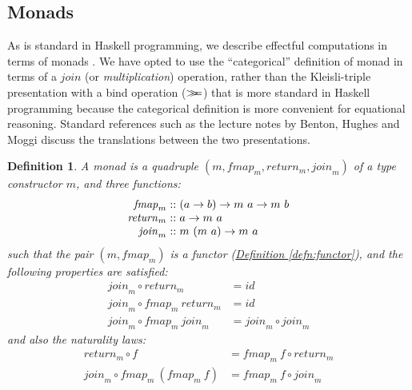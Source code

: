 \documentclass{jfp1}
\newcommand{\mbind}{\mathrel{>\kern-0.45em>\kern-0.45em=}}
\newtheorem{definition}{Definition}
\newcommand{\defref}[1]{\hyperref[#1]{Definition \ref*{#1}}}
\begin{document}
\subsection{Monads}

As is standard in Haskell programming, we describe effectful
computations in terms of monads \cite{moggi91notions,
  peytonjones93imperative}. We have opted to use the ``categorical''
definition of monad in terms of a $\mathit{join}$ (or
\emph{multiplication}) operation, rather than the Kleisli-triple
presentation with a bind operation ($\mbind$) that is more standard in
Haskell programming because the categorical definition is more
convenient for equational reasoning. Standard references such as the
lecture notes by Benton, Hughes and Moggi \cite{benton00monads}
discuss the translations between the two presentations.

\begin{definition}\label{defn:monad}
  A monad is a quadruple $(m, \mathit{fmap}_m, \mathit{return}_m,
  \mathit{join}_m)$ of a type constructor $m$, and three functions:
  \begin{displaymath}
    \begin{array}{r@{\hspace{0.3em}}c@{\hspace{0.3em}}l}
      \mathit{fmap}_m   & :: & (a \to b) \to m~a \to m~b \\
      \mathit{return}_m & :: & a \to m~a \\
      \mathit{join}_m   & :: & m~(m~a) \to m~a
    \end{array}
  \end{displaymath}
  such that the pair $(m, \mathit{fmap}_m)$ is a functor
  (\defref{defn:functor}), and the following properties are satisfied:
  \begin{align}
    \label{eq:monad-join-return}
    \mathit{join}_m \circ \mathit{return}_m & = \mathit{id} \\
    \label{eq:monad-join-fmap-return}
    \mathit{join}_m \circ \mathit{fmap}_m~\mathit{return}_m & = \mathit{id} \\
    \label{eq:monad-join-join}
    \mathit{join}_m \circ \mathit{fmap}_m~\mathit{join}_m & = \mathit{join}_m \circ \mathit{join}_m
  \end{align}
  and also the naturality laws:
  \begin{align}
    \label{eq:monad-return-natural}
    \mathit{return}_m \circ f & = \mathit{fmap}_m~f \circ \mathit{return}_m \\
    \label{eq:monad-join-natural}
    \mathit{join}_m \circ \mathit{fmap}_m~(\mathit{fmap}_m~f) & = \mathit{fmap}_m~f \circ \mathit{join}_m
  \end{align}
\end{definition}
\end{document}
